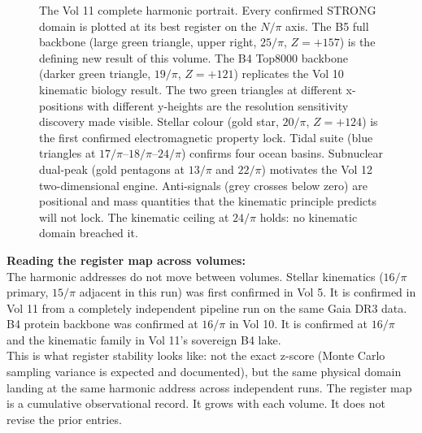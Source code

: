 \documentclass[11pt, letterpaper, openany]{book}
\begin{document}
\begin{figure}[H]
\caption{The Vol 11 complete harmonic portrait. Every confirmed STRONG domain
is plotted at its best register on the $N/\pi$ axis. The B5 full backbone
(large green triangle, upper right, $25/\pi$, $Z=+157$) is the defining new
result of this volume. The B4 Top8000 backbone (darker green triangle,
$19/\pi$, $Z=+121$) replicates the Vol 10 kinematic biology result.
The two green triangles at different x-positions with different y-heights
are the resolution sensitivity discovery made visible. Stellar colour (gold star,
$20/\pi$, $Z=+124$) is the first confirmed electromagnetic property lock.
Tidal suite (blue triangles at $17/\pi$--$18/\pi$--$24/\pi$) confirms
four ocean basins. Subnuclear dual-peak (gold pentagons at $13/\pi$ and $22/\pi$)
motivates the Vol 12 two-dimensional engine. Anti-signals (grey crosses below zero)
are positional and mass quantities that the kinematic principle predicts will not
lock. The kinematic ceiling at $24/\pi$ holds: no kinematic domain breached it.}
\label{fig:v11_portrait}
\end{figure}

\begin{warningbox}
\textbf{Reading the register map across volumes:}\\[0.5em]
The harmonic addresses do not move between volumes. Stellar kinematics
($16/\pi$ primary, $15/\pi$ adjacent in this run) was first confirmed in Vol 5.
It is confirmed in Vol 11 from a completely independent pipeline run on the same
Gaia DR3 data. B4 protein backbone was confirmed at $16/\pi$ in Vol 10.
It is confirmed at $16/\pi$ and the kinematic family in Vol 11's sovereign B4 lake.\\[0.5em]
This is what register stability looks like: not the exact z-score (Monte Carlo
sampling variance is expected and documented), but the same physical domain
landing at the same harmonic address across independent runs. The register map
is a cumulative observational record. It grows with each volume. It does not
revise the prior entries.
\end{warningbox}
\end{document}
